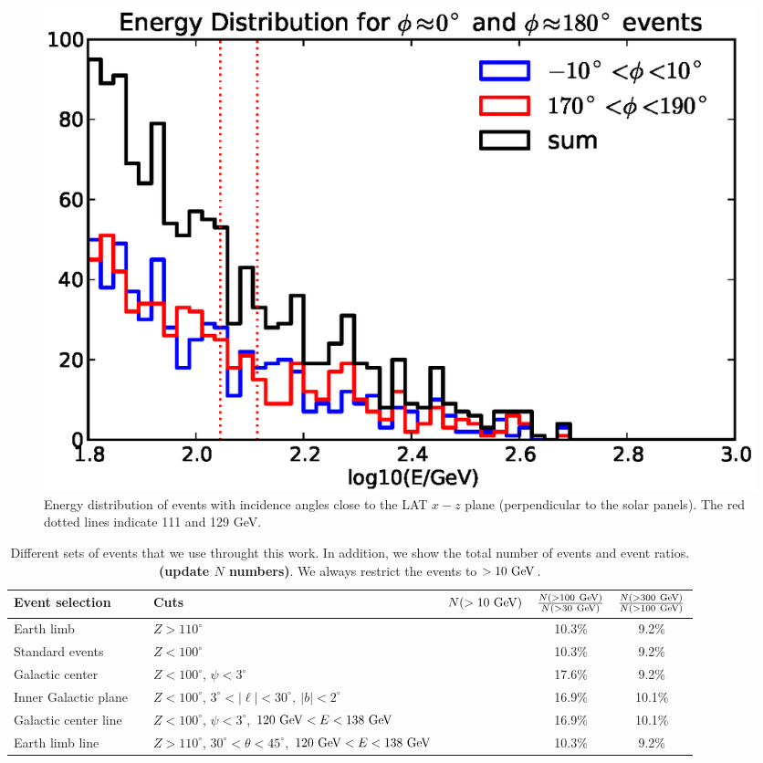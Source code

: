 \documentclass[aps,twocolumn,prd,superscriptaddress,showpacs,nofootinbib,fixfloat]{revtex4}
\newcommand{\GeV}{{\rm ~GeV}}
\begin{document}
\begin{figure}
\centering
\includegraphics[width=1.0\linewidth]{plots/phi_energy.eps}
\caption{Energy distribution of events with incidence angles close to
the LAT $x-z$ plane (perpendicular to the solar panels). The red dotted lines
indicate 111 and 129 GeV.}
\label{fig:spectrum_phi}
\end{figure}


\begin{table}
  \begin{tabular}{lllccc}
    \hline
    Event selection &&Cuts & $N(>10\GeV)$ & $\frac{N(>100\GeV)}{N(>30\GeV)}$ & $\frac{N(>300\GeV)}{N(>100\GeV)}$\\
    \hline
    Earth limb           &  & $Z>110^\circ$                                                  &  & 10.3\% & 9.2\% \\
    Standard events      &  & $Z<100^\circ$                                                  &  & 10.3\% & 9.2\% \\
    Galactic center      &  & $Z<100^\circ$, $\psi<3^\circ$                                  &  & 17.6\% & 9.2\% \\
    Inner Galactic plane &  & $Z<100^\circ$, $3^\circ < |\ell| < 30^\circ,\ |b|<2^\circ$     &  & 16.9\% & 10.1\% \\
    Galactic center line &  & $Z<100^\circ$, $\psi<3^\circ$, $120\GeV<E<138\GeV$             &  & 16.9\% & 10.1\% \\
    Earth limb line      &  & $Z>110^\circ$, $30^\circ<\theta<45^\circ$, $120\GeV<E<138\GeV$ &  & 10.3\% & 9.2\% \\ 
    \hline
  \end{tabular}
  \caption{Different sets of events that we use throught this work. In
  addition, we show the total number of events and event ratios.
  \textbf{(update $N$ numbers)}. We always restrict the events to $>10\GeV$.}
  \label{tab:regions}
\end{table}
\end{document}
